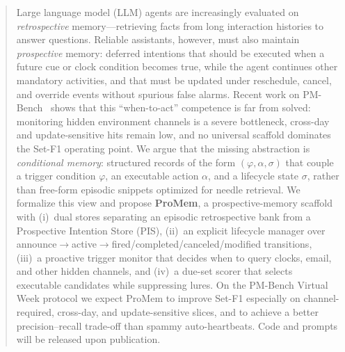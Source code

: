 \begin{abstract}
Large language model (LLM) agents are increasingly evaluated on \emph{retrospective} memory---retrieving facts from long interaction histories to answer questions. Reliable assistants, however, must also maintain \emph{prospective} memory: deferred intentions that should be executed when a future cue or clock condition becomes true, while the agent continues other mandatory activities, and that must be updated under reschedule, cancel, and override events without spurious false alarms. Recent work on PM-Bench~\cite{pmbench2026} shows that this ``when-to-act'' competence is far from solved: monitoring hidden environment channels is a severe bottleneck, cross-day and update-sensitive hits remain low, and no universal scaffold dominates the Set-F1 operating point. We argue that the missing abstraction is \emph{conditional memory}: structured records of the form $(\varphi,\alpha,\sigma)$ that couple a trigger condition $\varphi$, an executable action $\alpha$, and a lifecycle state $\sigma$, rather than free-form episodic snippets optimized for needle retrieval. We formalize this view and propose \textbf{ProMem}, a prospective-memory scaffold with (i)~dual stores separating an episodic retrospective bank from a Prospective Intention Store (PIS), (ii)~an explicit lifecycle manager over announce$\rightarrow$active$\rightarrow$fired/completed/canceled/modified transitions, (iii)~a proactive trigger monitor that decides when to query clocks, email, and other hidden channels, and (iv)~a due-set scorer that selects executable candidates while suppressing lures. On the PM-Bench Virtual Week protocol we expect ProMem to improve Set-F1 especially on channel-required, cross-day, and update-sensitive slices, and to achieve a better precision--recall trade-off than spammy auto-heartbeats. Code and prompts will be released upon publication.
\end{abstract}
